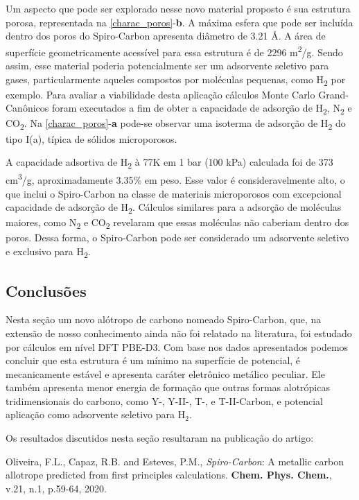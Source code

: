 	Um aspecto que pode ser explorado nesse novo material proposto é sua estrutura porosa, representada na \autoref{charac_poros}-\textbf{b}. A máxima esfera que pode ser incluída dentro dos poros do Spiro-Carbon apresenta diâmetro de 3.21 Å. A área de superfície geometricamente acessível para essa estrutura é de 2296 m\textsuperscript{2}/g. Sendo assim, esse material poderia potencialmente ser um adsorvente seletivo para gases, particularmente aqueles compostos por moléculas pequenas, como H\textsubscript{2} por exemplo. Para avaliar a viabilidade desta aplicação cálculos Monte Carlo Grand-Canônicos foram executados a fim de obter a capacidade de adsorção de H\textsubscript{2}, N\textsubscript{2} e CO\textsubscript{2}. Na \autoref{charac_poros}-\textbf{a} pode-se observar uma isoterma de adsorção de H\textsubscript{2} do tipo I(a), típica de sólidos microporosos. \cite{thommes2015physisorption} 
	
	A capacidade adsortiva de H\textsubscript{2} à 77K em 1 bar (100 kPa) calculada foi de 373 cm\textsuperscript{3}/g, aproximadamente 3.35\% em peso. Esse valor é consideravelmente alto, o que inclui o Spiro-Carbon na classe de materiais microporosos com excepcional capacidade de adsorção de H\textsubscript{2}.  \cite{blankenship2017cigarette, wong2006exceptional} Cálculos similares para a adsorção de moléculas maiores, como N\textsubscript{2} e CO\textsubscript{2} revelaram que essas moléculas não caberiam dentro dos poros. Dessa forma, o Spiro-Carbon pode ser considerado um adsorvente seletivo e exclusivo para H\textsubscript{2}.
	
	\subsection{Conclusões}
	
		Nesta seção um novo alótropo de carbono nomeado Spiro-Carbon, que, na extensão de nosso conhecimento ainda não foi relatado na literatura, foi estudado por cálculos em nível DFT PBE-D3. Com base nos dados apresentados podemos concluir que esta estrutura é um mínimo na superfície de potencial, é mecanicamente estável e apresenta caráter eletrônico metálico peculiar. Ele também apresenta menor energia de formação que outras formas alotrópicas tridimensionais do carbono, como Y-, Y-II-, T-, e T-II-Carbon, e potencial aplicação como adsorvente seletivo para H$_2$.  
		
		Os resultados discutidos nesta seção resultaram na publicação do artigo:
		
		\begin{citacao}
			Oliveira, F.L., Capaz, R.B. and Esteves, P.M., \textit{Spiro-Carbon}: A metallic carbon allotrope predicted from first principles calculations. \textbf{Chem. Phys. Chem.}, v.21, n.1, p.59-64, 2020.
		\end{citacao}
		
